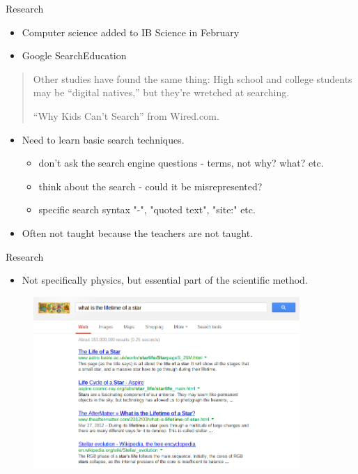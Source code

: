 \documentclass{beamer}
\begin{document}
\begin{frame}{Research}
    \begin{itemize}[<+->]
        \item Computer science added to IB Science in February
        \item Google SearchEducation
    \end{itemize}
    \pause
    \begin{quote}
        Other studies have found the same thing: High school and college students may be ``digital natives,'' but they're wretched at searching.
        
        \hfill \tiny{``Why Kids Can't Search'' from Wired.com.}
    \end{quote}
    \pause
    \begin{itemize}
        \item Need to learn basic search techniques.
        \begin{itemize}[<+->]
            \item don't ask the search engine questions - terms, not why? what? etc.
            \item think about the search - could it be misrepresented?
            \item specific search syntax "-", "quoted text", "site:" etc.
        \end{itemize}
        \pause
        \item Often not taught because the teachers are not taught.
    \end{itemize}
\end{frame}

\begin{frame}{Research}
    \begin{itemize}
        \item Not specifically physics, but essential part of the scientific method.
    \end{itemize} 
    \pause
    \begin{figure}
        \includegraphics[width=0.9\textwidth]{google_search.png}
    \end{figure}
\end{frame}
\end{document}
